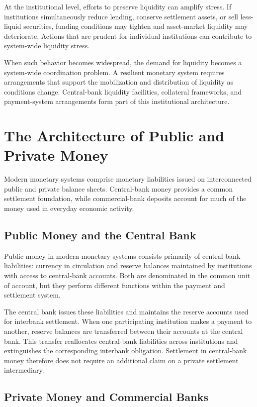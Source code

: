 At the institutional level, efforts to preserve liquidity can amplify stress. If institutions simultaneously reduce lending, conserve settlement assets, or sell less-liquid securities, funding conditions may tighten and asset-market liquidity may deteriorate. Actions that are prudent for individual institutions can  contribute to system-wide liquidity stress.

When such behavior becomes widespread, the demand for liquidity becomes a system-wide coordination problem. A resilient monetary system requires arrangements that support the mobilization and distribution of liquidity as conditions change. Central-bank liquidity facilities, collateral frameworks, and payment-system arrangements form part of this institutional architecture.


\section{The Architecture of Public and Private Money}
Modern monetary systems comprise monetary liabilities issued on interconnected public and private balance sheets. Central-bank money provides a common settlement foundation, while commercial-bank deposits account for much of the money used in everyday economic activity.

\subsection{Public Money and the Central Bank}

Public money in modern monetary systems consists primarily of central-bank liabilities: currency in circulation and reserve balances maintained by institutions with access to central-bank accounts. Both are denominated in the common unit of account, but they perform different functions within the payment and settlement system.

The central bank issues these liabilities and maintains the reserve accounts used for interbank settlement. When one participating institution makes a payment to another, reserve balances are transferred between their accounts at the central bank. This transfer reallocates central-bank liabilities across institutions and extinguishes the corresponding interbank obligation. Settlement in central-bank money therefore does not require an additional claim on a private settlement intermediary.

\subsection{Private Money and Commercial Banks}

